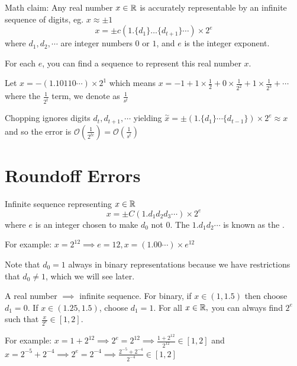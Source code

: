 \documentclass[12pt]{scrartcl}
\renewcommand{\O}{\mathcal{O}}
\begin{document}
\begin{remark}
  Math claim: Any real number $x \in \mathbb R$ is accurately representable by an infinite sequence of digits, eg. $x \approx \pm 1$
  \[x = \pm c(1.\{d_1\}\ldots\{d_{t+1}\}\cdots) \times 2^e\]
  where $d_1, d_2, \cdots$ are integer numbers $0$ or $1$, and $e$ is the integer exponent.

  For each $e$, you can find a sequence to represent this real number $x$. 
\end{remark}

\begin{example}
  Let $x = -(1.10110\cdots) \times 2^1$ which means $x = -1 + 1 \times \frac{1}{2} + 0 \times \frac{1}{2^2} + 1 \times \frac{1}{2^3} + \cdots$
  where the $\frac{1}{2^t}$ term, we denote as $\frac{1}{s^t}$
\end{example}

\begin{definition}[Truncating]
  Chopping ignores digits $d_t, d_{t+1}, \cdots$ yielding $\overset{\sim}{x} = \pm (1.\{d_1\}\cdots\{d_{t-1}\}) \times 2^e \approx x$
  and so the error is $\O(\frac{1}{2^{te}}) = \O(\frac{1}{s^t})$
\end{definition}

\section{Roundoff Errors}

\begin{definition}
  Infinite sequence representing $x \in \mathbb R$
  \[x = \pm C(1.d_1 d_2 d_3 \cdots) \times 2^e\]
  where $e$ is an integer chosen to make $d_0$ not $0$. The $1.d_1d_2\cdots$ is known as the 
  .

  For example: $x = 2^{12} \implies e = 12, x = (1.00\cdots) \times e^{12}$
\end{definition}

\begin{note}
  Note that $d_0 = 1$ always in binary representations because we have restrictions that $d_0 \neq 1$, which we will see later.
\end{note}

\begin{note}
  A real number $\implies$ infinite sequence. For binary, if $x \in (1, 1.5)$ then choose 
  $d_1 = 0$. If $x \in (1.25, 1.5)$, choose $d_1 = 1$. For all $x \in \mathbb R,$ you can always find 
  $2^e$ such that $\frac{x}{2^e} \in [1, 2]$. 

  For example: $x = 1 + 2^{12} \implies 2^e = 2^{12} \implies \frac{1 + 2^{12}}{2^{12}} \in [1, 2]$ and 
  $x = 2^{-5} + 2^{-4} \implies 2^e = 2^{-4} \implies \frac{2^{-5} + 2^{-4}}{2^{-4}} \in [1, 2]$
\end{note}
\end{document}
